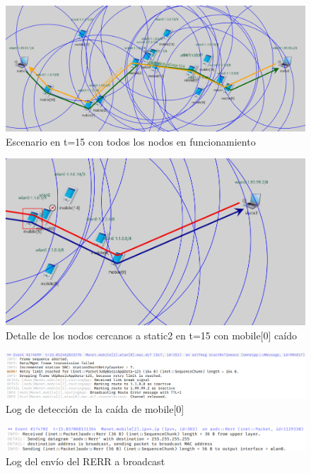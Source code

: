 \begin{figure}[H]
    \centering
    \includegraphics[width=125mm, scale=0.75]{imaxes/aodv/ejercicio4_1.png}
    \caption{Escenario en t=15 con todos los nodos en funcionamiento}
    \label{fig:escenariot15}
\end{figure}

\begin{figure}[H]
    \centering
    \includegraphics[width=125mm, scale=0.75]{imaxes/aodv/ejercicio4_2.png}
    \caption{Detalle de los nodos cercanos a static2 en t=15 con mobile[0] caído}
    \label{fig:nodocaidot15}
\end{figure}

\begin{figure}[H]
    \centering
    \includegraphics[width=125mm, scale=0.75]{imaxes/aodv/ejercicio4_3.png}
    \caption{Log de detección de la caída de mobile[0]}
    \label{fig:deteccioncaida}
\end{figure}

\begin{figure}[H]
    \centering
    \includegraphics[width=125mm, scale=0.75]{imaxes/aodv/ejercicio4_4.png}
    \caption{Log del envío del RERR a broadcast}
    \label{fig:caidabroadcast}
\end{figure}

